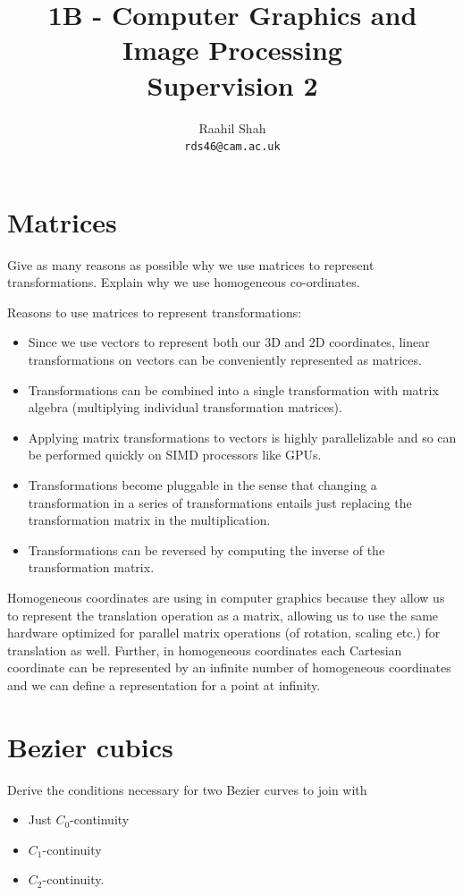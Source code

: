 \documentclass[11pt]{article}
\title{1B - Computer Graphics and Image Processing\\
Supervision 2}
\author{Raahil Shah\\
\texttt{rds46@cam.ac.uk}}
\begin{document}
\maketitle

\section{Matrices}
Give as many reasons as possible why we use matrices to represent transformations. Explain why we use homogeneous co-ordinates. 

Reasons to use matrices to represent transformations:
\begin{itemize}
	\item Since we use vectors to represent both our 3D and 2D coordinates, linear transformations on vectors can be conveniently represented as matrices.
	\item Transformations can be combined into a single transformation with matrix algebra (multiplying individual transformation matrices).
	\item Applying matrix transformations to vectors is highly parallelizable and so can be performed quickly on SIMD processors like GPUs. 
	\item Transformations become pluggable in the sense that changing a transformation in a series of transformations entails just replacing the transformation matrix in the multiplication. 
	\item Transformations can be reversed by computing the inverse of the transformation matrix. 
\end{itemize}

Homogeneous coordinates are using in computer graphics because they allow us to represent the translation operation as a matrix, allowing us to use the same hardware optimized for parallel matrix operations (of rotation, scaling etc.) for translation as well. Further, in homogeneous coordinates each Cartesian coordinate can be represented by an infinite number of homogeneous coordinates and we can define a representation for a point at infinity. 


\section{Bezier cubics}
Derive the conditions necessary for two Bezier curves to join with 
\begin{itemize}
	\item Just $C_0$-continuity
	\item $C_1$-continuity
	\item $C_2$-continuity. 
\end{itemize}
\end{document}
